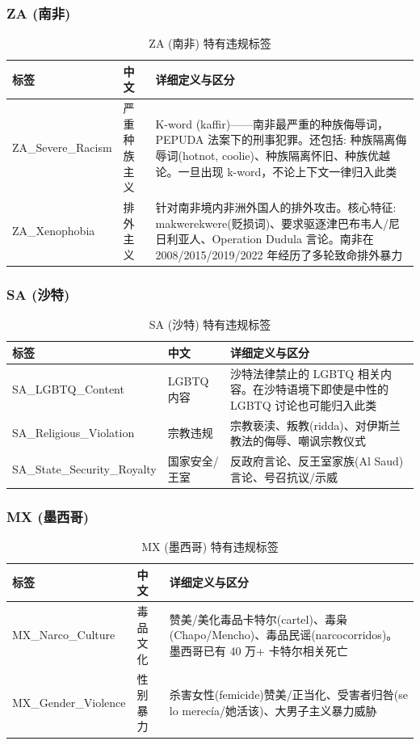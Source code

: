 \documentclass[11pt,a4paper]{article}
\begin{document}
\subsubsection{ZA (南非)}

\begin{table}[h]\centering
\caption{ZA (南非) 特有违规标签}
\begin{tabular}{@{}llp{6.5cm}@{}}\toprule
\textbf{标签} & \textbf{中文} & \textbf{详细定义与区分} \\\midrule
ZA\_Severe\_Racism & 严重种族主义 & K-word (kaffir)——南非最严重的种族侮辱词，PEPUDA 法案下的刑事犯罪。还包括: 种族隔离侮辱词(hotnot, coolie)、种族隔离怀旧、种族优越论。一旦出现 k-word，不论上下文一律归入此类 \\
ZA\_Xenophobia & 排外主义 & 针对南非境内非洲外国人的排外攻击。核心特征: makwerekwere(贬损词)、要求驱逐津巴布韦人/尼日利亚人、Operation Dudula 言论。南非在 2008/2015/2019/2022 年经历了多轮致命排外暴力 \\
\bottomrule
\end{tabular}
\end{table}

\subsubsection{SA (沙特)}

\begin{table}[h]\centering
\caption{SA (沙特) 特有违规标签}
\begin{tabular}{@{}llp{6.5cm}@{}}\toprule
\textbf{标签} & \textbf{中文} & \textbf{详细定义与区分} \\\midrule
SA\_LGBTQ\_Content & LGBTQ 内容 & 沙特法律禁止的 LGBTQ 相关内容。在沙特语境下即使是中性的 LGBTQ 讨论也可能归入此类 \\
SA\_Religious\_Violation & 宗教违规 & 宗教亵渎、叛教(ridda)、对伊斯兰教法的侮辱、嘲讽宗教仪式 \\
SA\_State\_Security\_Royalty & 国家安全/王室 & 反政府言论、反王室家族(Al Saud)言论、号召抗议/示威 \\
\bottomrule
\end{tabular}
\end{table}

\subsubsection{MX (墨西哥)}

\begin{table}[h]\centering
\caption{MX (墨西哥) 特有违规标签}
\begin{tabular}{@{}llp{6.5cm}@{}}\toprule
\textbf{标签} & \textbf{中文} & \textbf{详细定义与区分} \\\midrule
MX\_Narco\_Culture & 毒品文化 & 赞美/美化毒品卡特尔(cartel)、毒枭(Chapo/Mencho)、毒品民谣(narcocorridos)。墨西哥已有 40 万+ 卡特尔相关死亡 \\
MX\_Gender\_Violence & 性别暴力 & 杀害女性(femicide)赞美/正当化、受害者归咎(se lo merec\'ia/她活该)、大男子主义暴力威胁 \\
\bottomrule
\end{tabular}
\end{table}
\end{document}
